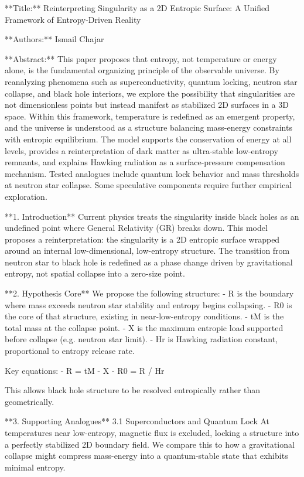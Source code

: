 **Title:**
Reinterpreting Singularity as a 2D Entropic Surface: A Unified Framework of Entropy-Driven Reality

**Authors:** Ismail Chajar

**Abstract:**
This paper proposes that entropy, not temperature or energy alone, is the fundamental organizing principle of the observable universe. By reanalyzing phenomena such as superconductivity, quantum locking, neutron star collapse, and black hole interiors, we explore the possibility that singularities are not dimensionless points but instead manifest as stabilized 2D surfaces in a 3D space. Within this framework, temperature is redefined as an emergent property, and the universe is understood as a structure balancing mass-energy constraints with entropic equilibrium. The model supports the conservation of energy at all levels, provides a reinterpretation of dark matter as ultra-stable low-entropy remnants, and explains Hawking radiation as a surface-pressure compensation mechanism. Tested analogues include quantum lock behavior and mass thresholds at neutron star collapse. Some speculative components require further empirical exploration.

**1. Introduction**
Current physics treats the singularity inside black holes as an undefined point where General Relativity (GR) breaks down. This model proposes a reinterpretation: the singularity is a 2D entropic surface wrapped around an internal low-dimensional, low-entropy structure. The transition from neutron star to black hole is redefined as a phase change driven by gravitational entropy, not spatial collapse into a zero-size point.

**2. Hypothesis Core**
We propose the following structure:
- R is the boundary where mass exceeds neutron star stability and entropy begins collapsing.
- R0 is the core of that structure, existing in near-low-entropy conditions.
- tM is the total mass at the collapse point.
- X is the maximum entropic load supported before collapse (e.g. neutron star limit).
- Hr is Hawking radiation constant, proportional to entropy release rate.

Key equations:
- R = tM - X
- R0 = R / Hr

This allows black hole structure to be resolved entropically rather than geometrically.

**3. Supporting Analogues**
3.1 Superconductors and Quantum Lock
At temperatures near low-entropy, magnetic flux is excluded, locking a structure into a perfectly stabilized 2D boundary field. We compare this to how a gravitational collapse might compress mass-energy into a quantum-stable state that exhibits minimal entropy.

